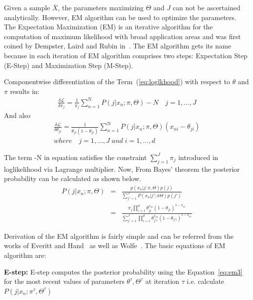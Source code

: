 Given a sample $\overline{{X}}$, the parameters maximizing $\Theta$ and $J$ can not be ascertained analytically. However, EM algorithm can be used to optimize the parameters. The Expectation Maximization (EM) is an iterative algorithm for the computation of maximum likelihood with broad application areas and was first coined by Dempster, Laird and Rubin in~\cite{expectmax}. The EM algorithm gets its name because in each iteration of EM algorithm comprises two steps: Expectation Step (E-Step) and Maximization Step (M-Step).

Componentwise differentiation of the Term~(\ref{eq:loglkhood}) with respect to $\theta$ and $\pi$ results in:
\begin{eqnarray}
\label{eq:em1}
\frac{\delta \mathcal{L}}{\delta \pi_{j}} = \frac{1}{\pi_{j}} \displaystyle\sum_{n=1}^{\mathrm{N}} P(j|x_n;\pi,\Theta)-N \quad j=1, \ldots, J
\end{eqnarray} 
And also
\begin{eqnarray}
\label{eq:em2}
\frac{\delta \mathcal{L}}{\delta \theta_{ji}} = \frac{1}{\theta_{ji}(1-\theta_{ji})} \displaystyle\sum_{n=1}^{\mathrm{N}}P(j|x_n;\pi,\Theta) (x_{ni}-\theta_{ji}) \\
where \quad j=1, \ldots, J \; and \; i=1,\ldots, d \nonumber
\end{eqnarray} 

The term -N in equation satisfies the constraint $\sum_{j=1}^{J}\pi_j$ introduced in loglikelihood via Lagrange multiplier. Now, From Bayes' theorem the posterior probability can be calculated as shown below.
\begin{eqnarray}
\label{eq:em3}
P(j|x_n;\pi,\Theta) & = & \frac{p(x_n|j;\pi,\Theta)p(j)}{\sum_{j'=1}^{J} P(x_n|j';\pi\Theta)p(j')} \nonumber \\
& = & \frac{\pi_j \prod_{i=1}^{d} \theta_{ji}^{x_{ni}}(1-\theta_{ji})^{1-x_{ni}}} {\sum_{j'=1}^{J} \prod_{i=1}^{d} \theta_{j'i}^{x_{ni}}(1-\theta_{j'i})^{1-x_{ni}}} 
\end{eqnarray}

Derivation of the EM algorithm is fairly simple and can be referred from the works of Everitt and Hand~\cite{everittmixdist} as well as Wolfe~\cite{wolfe}. The basic equations of EM algorithm are:

\textbf{E-step:} E-step computes the posterior probability using the Equation~\ref{eq:em3} for the most recent values of parameters {$\theta ^{\tau}, \Theta ^{\tau}$} at iteration $\tau$ i.e. calculate $P(j|x_n;\pi ^{\tau},\Theta ^{\tau})$

